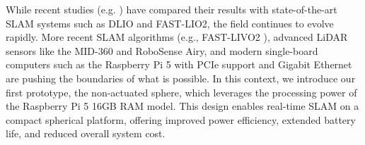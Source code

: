 \documentclass[a4paper, conference]{IEEEtran}
\begin{document}
While recent studies (e.g. \cite{Kalman_filter_sphere}) have compared their results with state-of-the-art SLAM systems such as DLIO\cite{dlio} and FAST-LIO2\cite{fastlio2}, the field continues to evolve rapidly. 
More recent SLAM algorithms (e.g., FAST-LIVO2 \cite{fastlivo2}), advanced LiDAR sensors like the MID-360 and RoboSense Airy, and modern single-board computers such as the Raspberry Pi 5 with PCIe support and Gigabit Ethernet are pushing the boundaries of what is possible. 
In this context, we introduce our first prototype, the non-actuated sphere, which leverages the processing power of the Raspberry Pi 5 16GB RAM model. 
This design enables real-time SLAM on a compact spherical platform, offering improved power efficiency, extended battery life, and reduced overall system cost.
\end{document}
